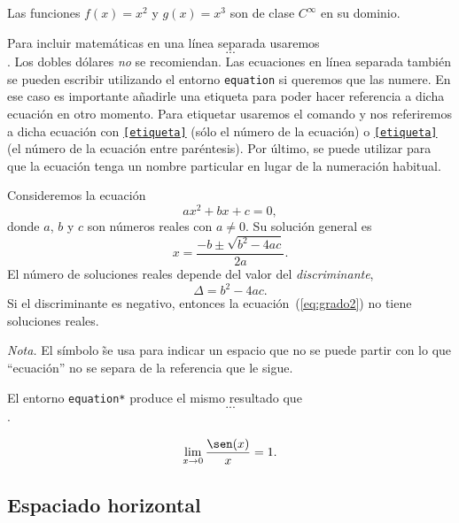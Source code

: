 \documentclass{article}
\numberwithin{equation}{section}
\theoremstyle{plain}
\theoremstyle{definition}
\theoremstyle{remark}
\begin{document}
\begin{codigo-arriba}
Las funciones $f(x)=x^{2}$ y \(g(x)=x^{3}\) son de clase \(C^{\infty}\) en su dominio.
\end{codigo-arriba}

Para incluir matemáticas en una línea separada usaremos \texttt{\[...\]}. Los dobles dólares \emph{no} se recomiendan. Las ecuaciones en línea separada también se pueden escribir utilizando el entorno \texttt{equation} si queremos que las numere. En ese caso es importante añadirle una etiqueta para poder hacer referencia a dicha ecuación en otro momento. Para etiquetar usaremos el comando \texttt{\label{etiqueta}} y nos referiremos a dicha ecuación con \texttt{\ref{etiqueta}} (sólo el número de la ecuación) o 
\texttt{\eqref{etiqueta}} (el número de la ecuación entre paréntesis). 
Por último, \texttt{} se puede utilizar para que la ecuación tenga un nombre particular en lugar de la numeración habitual.


\begin{codigo-arriba}
Consideremos la ecuación 
\begin{equation} \label{eq:grado2}
    ax^2+bx+c=0,
\end{equation}
donde \(a\), \(b\) y \(c\) son números reales con $a \neq 0$. Su solución 
general es
\begin{equation} \label{eq:solucion}
    x=\frac{-b \pm \sqrt{b^2-4ac}}{2a}. \tag{Solución}
\end{equation}
El número de soluciones reales depende del valor del \emph{discriminante}, 
\[
    \Delta = b^2-4ac.
\]
Si el discriminante es negativo, entonces la ecuación~(\ref{eq:grado2}) no 
tiene soluciones reales.
\end{codigo-arriba}
\emph{Nota.} El símbolo \~ se usa para indicar un espacio que no se puede partir con lo que ``ecuación'' no se separa de la referencia que le sigue.

El entorno \texttt{equation*} produce el mismo resultado que \texttt{\[...\]}.

\begin{codigo-lado}
\begin{equation*}
	\lim_{x \to 0} \frac{\sen(x)}{x}=1.
\end{equation*}	
\end{codigo-lado}



\subsection{Espaciado horizontal}
\end{document}
